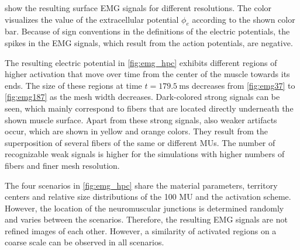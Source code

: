  show the resulting surface EMG signals for different resolutions. The color visualizes the value of the extracellular potential $\phi_e$ according to the shown color bar. Because of sign conventions in the definitions of the electric potentials, the spikes in the EMG signals, which result from the action potentials, are negative.

The resulting electric potential in \cref{fig:emg_hpc} exhibits different regions of higher activation that move over time from the center of the muscle towards its ends. The size of these regions at time ${t=\SI{179.5}{\ms}}$ decreases from \cref{fig:emg37} to \cref{fig:emg187} as the mesh width decreases. 
Dark-colored strong signals can be seen, which mainly correspond to fibers that are located directly underneath the shown muscle surface.
Apart from these strong signals, also weaker artifacts occur, which are shown in yellow and orange colors. They result from the superposition of several fibers of the same or different MUs. The number of recognizable weak signals is higher for the simulations with higher numbers of fibers and finer mesh resolution.

The four scenarios in \cref{fig:emg_hpc} share the material parameters, territory centers and relative size distributions of the 100 MU and the activation scheme. However, the location of the neuromuscular junctions is determined randomly and varies between the scenarios. Therefore, the resulting EMG signals are not refined images of each other.  However, a similarity of activated regions on a coarse scale can be observed in all scenarios.

